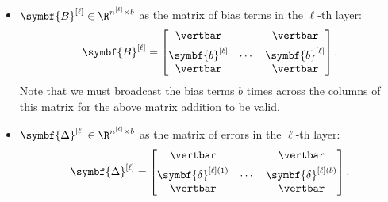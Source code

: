 \documentclass{article}
\begin{document}
\begin{itemize}
          \begin{equation*}
              \symbf{Z}^{\left[ \ell \right]} =
              \begin{bmatrix}
                  \vertbar                                         &        & \vertbar                                         \\[1ex]
                  \symbf{z}^{\left[ \ell \right] \left( 1 \right)} & \cdots & \symbf{z}^{\left[ \ell \right] \left( b \right)} \\
                  \vertbar                                         &        & \vertbar
              \end{bmatrix}
              = \symbf{W}^{\left[ \ell \right]} \symbf{A}^{\left[ \ell - 1 \right]} + \symbf{B}^{\left[ \ell \right]}
              .
          \end{equation*}
    \item \(\symbf{B}^{\left[ \ell \right]} \in \R^{n^{\left[ \ell \right]} \times b}\) as the matrix of bias terms in the \(\ell\)-th layer:
          \begin{equation*}
              \symbf{B}^{\left[ \ell \right]} =
              \begin{bmatrix}
                  \vertbar                        &        & \vertbar                        \\[1ex]
                  \symbf{b}^{\left[ \ell \right]} & \cdots & \symbf{b}^{\left[ \ell \right]} \\
                  \vertbar                        &        & \vertbar
              \end{bmatrix}
              .
          \end{equation*}
          Note that we must broadcast the bias terms \(b\) times across
          the columns of this matrix for the above matrix addition to be
          valid.
    \item \(\symbf{\Delta}^{\left[ \ell \right]} \in \R^{n^{\left[ \ell \right]} \times b}\) as the matrix of errors in the \(\ell\)-th layer:
          \begin{equation*}
              \symbf{\Delta}^{\left[ \ell \right]} =
              \begin{bmatrix}
                  \vertbar                                              &        & \vertbar                                              \\[1ex]
                  \symbf{\delta}^{\left[ \ell \right] \left( 1 \right)} & \cdots & \symbf{\delta}^{\left[ \ell \right] \left( b \right)} \\
                  \vertbar                                              &        & \vertbar
              \end{bmatrix}
              .
          \end{equation*}
\end{itemize}
\end{document}
